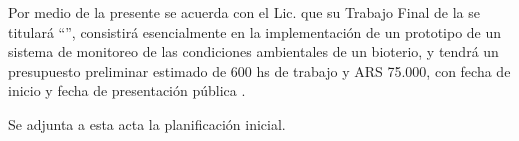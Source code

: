 \documentclass[
11pt, %
]{charter}
\begin{document}
\vspace{2cm}


Por medio de la presente se acuerda con el Lic. \authorname\hspace{1px} que su Trabajo Final de la \degreename\hspace{1px} se titulará ``\ttitle'', consistirá esencialmente en {la implementación de un prototipo de un sistema de monitoreo de las condiciones ambientales de un bioterio}, y tendrá un presupuesto preliminar estimado de {600} hs de trabajo y {ARS 75.000}, con fecha de inicio \fechaInicioName\hspace{1px} y fecha de presentación pública \fechaFinalName.

Se adjunta a esta acta la planificación inicial.

\vfill
\end{document}
